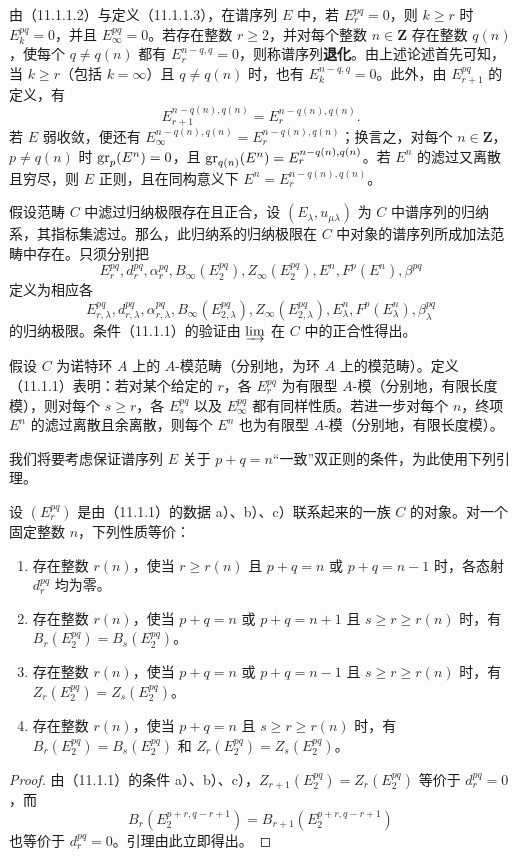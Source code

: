 由（11.1.1.2）与定义（11.1.1.3），在谱序列 $E$ 中，若 $E_r^{pq}=0$，则 $k\geq r$ 时 $E_k^{pq}=0$，并且 $E_\infty^{pq}=0$。若存在整数 $r\geq2$，并对每个整数 $n\in\mathbf Z$ 存在整数 $q(n)$，使每个 $q\ne q(n)$ 都有 $E_r^{n-q,q}=0$，则称谱序列\textbf{退化}。由上述论述首先可知，当 $k\geq r$（包括 $k=\infty$）且 $q\ne q(n)$ 时，也有 $E_k^{n-q,q}=0$。此外，由 $E_{r+1}^{pq}$ 的定义，有
\[
E_{r+1}^{n-q(n),q(n)}=E_r^{n-q(n),q(n)}.
\]
若 $E$ 弱收敛，便还有 $E_\infty^{n-q(n),q(n)}=E_r^{n-q(n),q(n)}$；换言之，对每个 $n\in\mathbf Z$，$p\ne q(n)$ 时 $\operatorname{gr}_p(E^n)=0$，且 $\operatorname{gr}_{q(n)}(E^n)=E_r^{n-q(n),q(n)}$。若 $E^n$ 的滤过又离散且穷尽，则 $E$ 正则，且在同构意义下 $E^n=E_r^{n-q(n),q(n)}$。

假设范畴 $C$ 中滤过归纳极限存在且正合，设 $(E_\lambda,u_{\mu\lambda})$ 为 $C$ 中谱序列的归纳系，其指标集滤过。那么，此归纳系的归纳极限在 $C$ 中对象的谱序列所成加法范畴中存在。只须分别把
\[
E_r^{pq},d_r^{pq},\alpha_r^{pq},B_\infty(E_2^{pq}),Z_\infty(E_2^{pq}),E^n,F^p(E^n),\beta^{pq}
\]
定义为相应各
\[
E_{r,\lambda}^{pq},d_{r,\lambda}^{pq},\alpha_{r,\lambda}^{pq},
B_\infty(E_{2,\lambda}^{pq}),Z_\infty(E_{2,\lambda}^{pq}),E_\lambda^n,F^p(E_\lambda^n),\beta_\lambda^{pq}
\]
的归纳极限。条件（11.1.1）的验证由 $\varinjlim$ 在 $C$ 中的正合性得出。

假设 $C$ 为诺特环 $A$ 上的 $A$-模范畴（分别地，为环 $A$ 上的模范畴）。定义（11.1.1）表明：若对某个给定的 $r$，各 $E_r^{pq}$ 为有限型 $A$-模（分别地，有限长度模），则对每个 $s\geq r$，各 $E_s^{pq}$ 以及 $E_\infty^{pq}$ 都有同样性质。若进一步对每个 $n$，终项 $E^n$ 的滤过离散且余离散，则每个 $E^n$ 也为有限型 $A$-模（分别地，有限长度模）。

我们将要考虑保证谱序列 $E$ 关于 $p+q=n$“一致”双正则的条件，为此使用下列引理。

设 $(E_r^{pq})$ 是由（11.1.1）的数据 a）、b）、c）联系起来的一族 $C$ 的对象。对一个固定整数 $n$，下列性质等价：
\begin{enumerate}[label=\alph*)]
\item 存在整数 $r(n)$，使当 $r\geq r(n)$ 且 $p+q=n$ 或 $p+q=n-1$ 时，各态射 $d_r^{pq}$ 均为零。
\item 存在整数 $r(n)$，使当 $p+q=n$ 或 $p+q=n+1$ 且 $s\geq r\geq r(n)$ 时，有 $B_r(E_2^{pq})=B_s(E_2^{pq})$。
\item 存在整数 $r(n)$，使当 $p+q=n$ 或 $p+q=n-1$ 且 $s\geq r\geq r(n)$ 时，有 $Z_r(E_2^{pq})=Z_s(E_2^{pq})$。
\item 存在整数 $r(n)$，使当 $p+q=n$ 且 $s\geq r\geq r(n)$ 时，有 $B_r(E_2^{pq})=B_s(E_2^{pq})$ 和 $Z_r(E_2^{pq})=Z_s(E_2^{pq})$。
\end{enumerate}
\begin{proof}
由（11.1.1）的条件 a）、b）、c），$Z_{r+1}(E_2^{pq})=Z_r(E_2^{pq})$ 等价于 $d_r^{pq}=0$，而
\[
B_r(E_2^{p+r,q-r+1})=B_{r+1}(E_2^{p+r,q-r+1})
\]
也等价于 $d_r^{pq}=0$。引理由此立即得出。
\end{proof}

